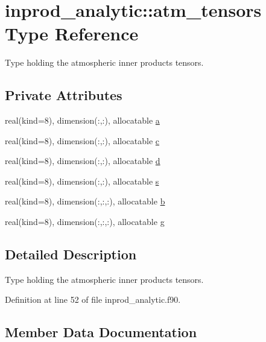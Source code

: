 \hypertarget{structinprod__analytic_1_1atm__tensors}{}\section{inprod\+\_\+analytic\+:\+:atm\+\_\+tensors Type Reference}
\label{structinprod__analytic_1_1atm__tensors}


Type holding the atmospheric inner products tensors.  


\subsection*{Private Attributes}
\begin{DoxyCompactItemize}
\item 
real(kind=8), dimension(\+:,\+:), allocatable \hyperlink{structinprod__analytic_1_1atm__tensors_af50962da7a48c98d8b118dee9cc16dcd}{a}
\item 
real(kind=8), dimension(\+:,\+:), allocatable \hyperlink{structinprod__analytic_1_1atm__tensors_a6f560bb68ce7081409034cb755e7a164}{c}
\item 
real(kind=8), dimension(\+:,\+:), allocatable \hyperlink{structinprod__analytic_1_1atm__tensors_a00e06ac193f03e4dcd337439cc489f78}{d}
\item 
real(kind=8), dimension(\+:,\+:), allocatable \hyperlink{structinprod__analytic_1_1atm__tensors_ad95a5329b72aae59807e7cdf043ab52c}{s}
\item 
real(kind=8), dimension(\+:,\+:,\+:), allocatable \hyperlink{structinprod__analytic_1_1atm__tensors_aa6b446e5bd3e7ea7278f1c1cad7f46cf}{b}
\item 
real(kind=8), dimension(\+:,\+:,\+:), allocatable \hyperlink{structinprod__analytic_1_1atm__tensors_a9b4ecfbc139ac739d5ec82b087e421a5}{g}
\end{DoxyCompactItemize}


\subsection{Detailed Description}
Type holding the atmospheric inner products tensors. 

Definition at line 52 of file inprod\+\_\+analytic.\+f90.



\subsection{Member Data Documentation}
